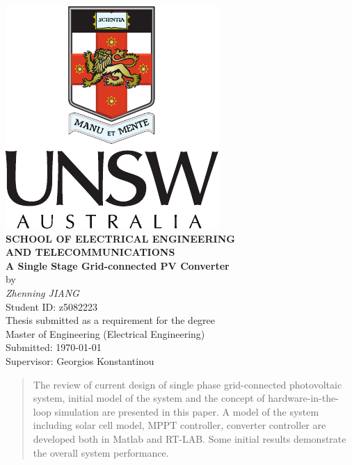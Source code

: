 \begin{center}
\includegraphics{PortraitColourPos-eps-converted-to}\\[0.5cm]
\textbf{\large SCHOOL OF ELECTRICAL ENGINEERING\\
AND TELECOMMUNICATIONS}\\[2cm]
{\addtolength{\baselineskip}{0.5cm}
\textbf{\Huge
A Single Stage Grid-connected PV Converter} \\[0.5cm]
}
{\Large by}\\[0.5cm]
\textit{\huge
Zhenning JIANG}\\[0.5cm]
{\Large
Student ID: z5082223}\\[1.5cm]
{\Large
Thesis submitted as a requirement for the degree\\
Master of Engineering (Electrical Engineering)\\[2ex]
\vfill
Submitted: \today\\
Supervisor: Georgios Konstantinou
\vspace*{-1cm}
}
\end{center}

\begin{abstract}
The review of current design of single phase grid-connected photovoltaic system, initial model of the system and the concept of hardware-in-the-loop simulation are presented in this paper. A model of the system including solar cell model, MPPT controller, converter controller are developed both in Matlab and RT-LAB. Some initial results demonstrate the overall system performance. 
\end{abstract}
